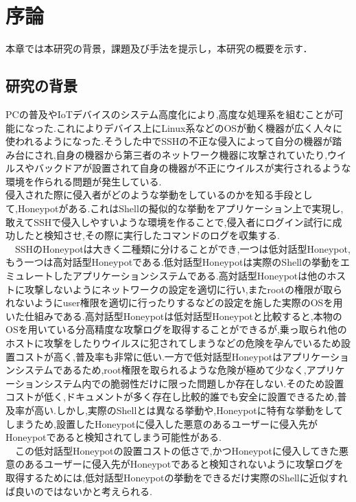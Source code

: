 \chapter{序論}
\label{introduction}

本章では本研究の背景，課題及び手法を提示し，本研究の概要を示す．

\section{研究の背景}
\label{introduction:haikei}

PCの普及やIoTデバイスのシステム高度化により,高度な処理系を組むことが可能になった.これによりデバイス上にLinux系などのOSが動く機器が広く人々に使われるようになった.そうした中でSSHの不正な侵入によって自分の機器が踏み台にされ,自身の機器から第三者のネットワーク機器に攻撃されていたり,ウイルスやバックドアが設置されて自身の機器が不正にウイルスが実行されるような環境を作られる問題が発生している.\\
 侵入された際に侵入者がどのような挙動をしているのかを知る手段として,Honeypotがある.これはShellの擬似的な挙動をアプリケーション上で実現し,敢えてSSHで侵入しやすいような環境を作ることで,侵入者にログイン試行に成功したと検知させ,その際に実行したコマンドのログを収集する.\\
\ \ SSHのHoneypotは大きく二種類に分けることができ,一つは低対話型Honeypot,もう一つは高対話型Honeypotである.低対話型Honeypotは実際のShellの挙動をエミュレートしたアプリケーションシステムである.高対話型Honeypotは他のホストに攻撃しないようにネットワークの設定を適切に行い,またrootの権限が取られないようにuser権限を適切に行ったりするなどの設定を施した実際のOSを用いた仕組みである.高対話型Honeypotは低対話型Honeypotと比較すると,本物のOSを用いている分高精度な攻撃ログを取得することができるが,乗っ取られ他のホストに攻撃をしたりウイルスに犯されてしまうなどの危険を孕んでいるため設置コストが高く,普及率も非常に低い.一方で低対話型Honeypotはアプリケーションシステムであるため,root権限を取られるような危険が極めて少なく,アプリケーションシステム内での脆弱性だけに限った問題しか存在しない.そのため設置コストが低く,ドキュメントが多く存在し比較的誰でも安全に設置できるため,普及率が高い.しかし,実際のShellとは異なる挙動や,Honeypotに特有な挙動をしてしまうため,設置したHoneypotに侵入した悪意のあるユーザーに侵入先がHoneypotであると検知されてしまう可能性がある.\\
\ \ この低対話型Honeypotの設置コストの低さで,かつHoneypotに侵入してきた悪意のあるユーザーに侵入先がHoneypotであると検知されないように攻撃ログを取得するためには,低対話型Honeypotの挙動をできるだけ実際のShellに近似すれば良いのではないかと考えられる.\\
